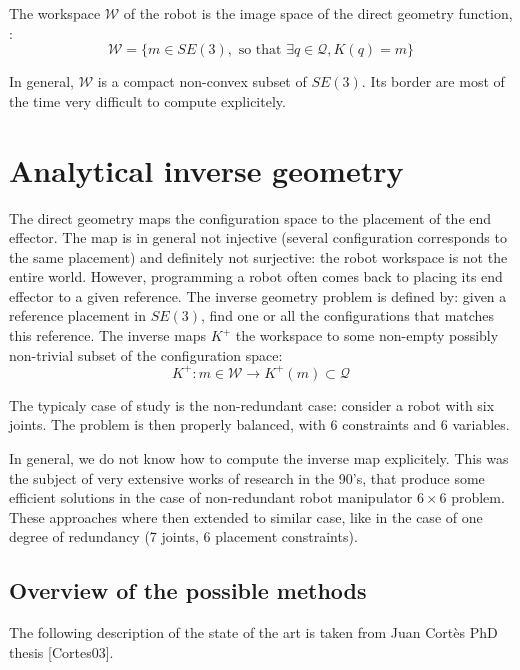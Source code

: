 \documentclass{book}
\begin{document}
The workspace $\mathcal{W}$ of the robot is the image space of the direct geometry function, \mie:
\[ \mathcal{W} = \Big\{ m \in SE(3), \textrm{ so that } \exists q \in \mathcal{Q}, K(q) = m \Big\} \]

In general, $\mathcal{W}$ is a compact non-convex subset of $SE(3)$. Its border are most of the time very difficult to compute explicitely.

\chapter{Analytical inverse geometry} \label{sec:anainvgeom}

The direct geometry maps the configuration space to the placement of the end effector. The map is in general not injective (several configuration corresponds to the same placement) and definitely not surjective: the robot workspace is not the entire world. However, programming a robot often comes back to placing its end effector to a given reference. The inverse geometry problem is defined by: given a reference placement in $SE(3)$, find one or all the configurations that matches this reference. The inverse maps $K^+$ the workspace to some non-empty  possibly non-trivial subset of the configuration space:
\[ K^+: m \in \mathcal{W} \rightarrow K^+(m) \subset \mathcal{Q} \]

The typicaly case of study is the non-redundant case: consider a robot with six joints. The problem is then properly balanced, with 6 constraints and 6 variables. 

In general, we do not know how to compute the inverse map explicitely. This was the subject of very extensive works of research in the 90's, that produce some efficient solutions in the case of non-redundant robot manipulator  $6 \times 6$ problem. These approaches where then extended to similar case, like in the case of one degree of redundancy (7 joints, 6 placement constraints).

\section{Overview of the possible methods}

The following description of the state of the art is taken from Juan Cort\`es PhD thesis [Cortes03].
\end{document}
